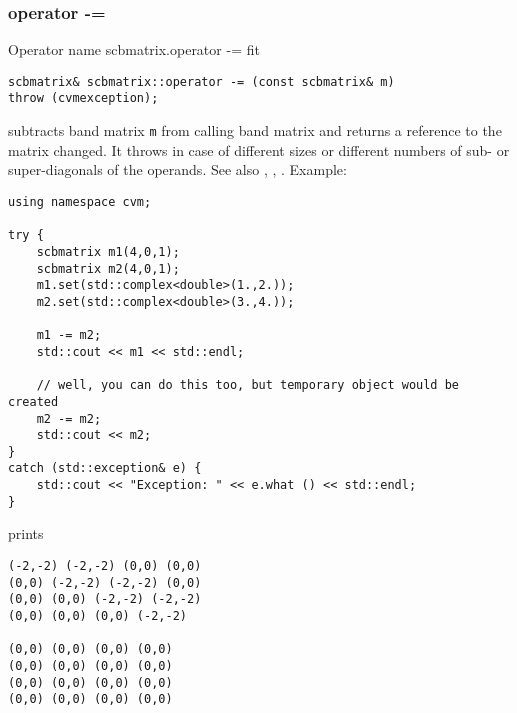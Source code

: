 \subsubsection{operator -=}
Operator%
\pdfdest name {scbmatrix.operator -=} fit
\begin{verbatim}
scbmatrix& scbmatrix::operator -= (const scbmatrix& m) 
throw (cvmexception);
\end{verbatim}
subtracts  band matrix \verb"m" from  calling band matrix
and returns a reference to
the matrix changed.
It throws  
in case of different sizes or different numbers of sub- or super-diagonals
of the operands.
See also ,
,
.
Example:
\begin{Verbatim}
using namespace cvm;

try {
    scbmatrix m1(4,0,1);
    scbmatrix m2(4,0,1);
    m1.set(std::complex<double>(1.,2.));
    m2.set(std::complex<double>(3.,4.));

    m1 -= m2;
    std::cout << m1 << std::endl;

    // well, you can do this too, but temporary object would be created
    m2 -= m2; 
    std::cout << m2;
}
catch (std::exception& e) {
    std::cout << "Exception: " << e.what () << std::endl;
}
\end{Verbatim}
prints
\begin{Verbatim}
(-2,-2) (-2,-2) (0,0) (0,0)
(0,0) (-2,-2) (-2,-2) (0,0)
(0,0) (0,0) (-2,-2) (-2,-2)
(0,0) (0,0) (0,0) (-2,-2)

(0,0) (0,0) (0,0) (0,0)
(0,0) (0,0) (0,0) (0,0)
(0,0) (0,0) (0,0) (0,0)
(0,0) (0,0) (0,0) (0,0)
\end{Verbatim}
\newpage



